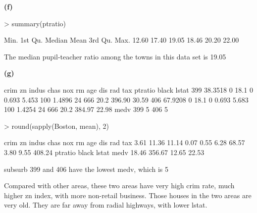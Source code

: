 \documentclass[a4paper]{article}
\renewcommand{\part}[1] {\vspace{.10in} {\bf (#1)}}
\begin{document}
\part{f}
\begin{Schunk}
\begin{Sinput}
> summary(ptratio)
\end{Sinput}
\begin{Soutput}
   Min. 1st Qu.  Median    Mean 3rd Qu.    Max. 
  12.60   17.40   19.05   18.46   20.20   22.00 
\end{Soutput}
\end{Schunk}
{\color{red}
The median pupil-teacher ratio among the towns in this data set is 19.05}


\part{g}
\begin{Schunk}
\begin{Soutput}
       crim zn indus chas   nox    rm age    dis rad tax ptratio  black lstat
399 38.3518  0  18.1    0 0.693 5.453 100 1.4896  24 666    20.2 396.90 30.59
406 67.9208  0  18.1    0 0.693 5.683 100 1.4254  24 666    20.2 384.97 22.98
    medv
399    5
406    5
\end{Soutput}
\begin{Sinput}
> round(sapply(Boston, mean), 2)
\end{Sinput}
\begin{Soutput}
   crim      zn   indus    chas     nox      rm     age     dis     rad     tax 
   3.61   11.36   11.14    0.07    0.55    6.28   68.57    3.80    9.55  408.24 
ptratio   black   lstat    medv 
  18.46  356.67   12.65   22.53 
\end{Soutput}
\end{Schunk}

\begin{enumerate}
{\color{red}
\item subsurb 399 and 406 have the lowest medv, which is 5
\item Compared with other areas, these two areas have very high crim rate, much higher zn index, with more non-retail business. Those houses in the two areas are very old. They are far away from radial highways, with lower lstat.
}
\end{enumerate}
\end{document}
